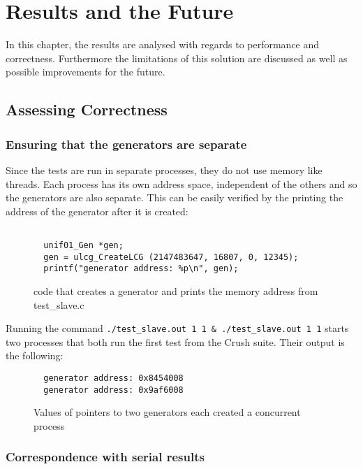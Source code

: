 \chapter{Results and the Future}
\label{cha:results}
In this chapter, the results are analysed with regards to performance and correctness. Furthermore the limitations of this solution are discussed as well as possible improvements for the future.

\section{Assessing Correctness}
\subsection{Ensuring that the generators are separate}
Since the tests are run in separate processes, they do not use memory like threads. Each process has its own address space, independent of the others and so the generators are also separate. This can be easily verified by the printing the address of the generator after it is created:

\begin{figure}[h]
  \begin{verbatim}

  unif01_Gen *gen;
  gen = ulcg_CreateLCG (2147483647, 16807, 0, 12345);
  printf("generator address: %p\n", gen);

  \end{verbatim}
  \caption{code that creates a generator and prints the memory address from test\_slave.c}
  \label{fig:generator_address}
\end{figure}

Running the command \texttt{./test\_slave.out 1 1 \& ./test\_slave.out 1 1} starts two processes that both run the first test from the Crush suite. Their output is the following:

\begin{figure}[h]
  \begin{verbatim}
  generator address: 0x8454008
  generator address: 0x9af6008
  \end{verbatim}
  \caption{Values of pointers to two generators each created a concurrent process}
  \label{fig:generator_address_output}
\end{figure}

\subsection{Correspondence with serial results}


